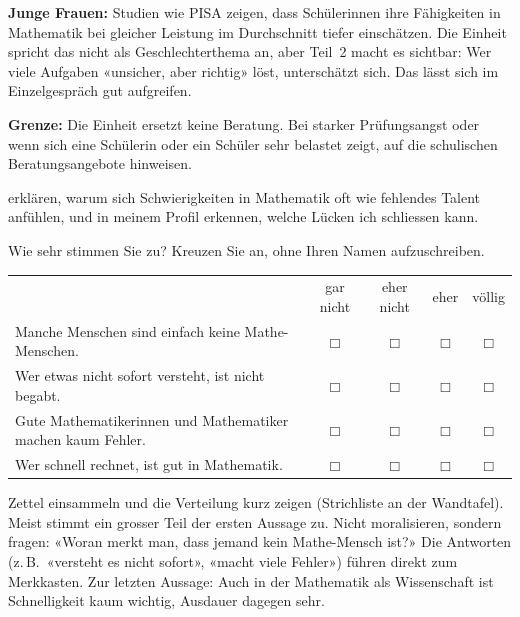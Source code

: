 \documentclass[11pt]{exam}
\begin{document}
\begin{lehrperson}[Überblick]
\textbf{Junge Frauen:} Studien wie PISA zeigen, dass Schülerinnen ihre
Fähigkeiten in Mathematik bei gleicher Leistung im Durchschnitt tiefer
einschätzen. Die Einheit spricht das nicht als Geschlechterthema an, aber
Teil~2 macht es sichtbar: Wer viele Aufgaben «unsicher, aber richtig» löst,
unterschätzt sich. Das lässt sich im Einzelgespräch gut aufgreifen.

\textbf{Grenze:} Die Einheit ersetzt keine Beratung. Bei starker
Prüfungsangst oder wenn sich eine Schülerin oder ein Schüler sehr belastet
zeigt, auf die schulischen Beratungsangebote hinweisen.
\end{lehrperson}

  {erklären, warum sich Schwierigkeiten in Mathematik oft wie fehlendes
   Talent anfühlen, und in meinem Profil erkennen, welche Lücken ich
   schliessen kann.}

\begin{einstieg}
Wie sehr stimmen Sie zu? Kreuzen Sie an, ohne Ihren Namen aufzuschreiben.
\begin{center}
\renewcommand{\arraystretch}{1.5}
\begin{tabular}{p{9.5cm}cccc}
  & \small gar nicht & \small eher nicht & \small eher & \small völlig \\
  Manche Menschen sind einfach keine Mathe-Menschen.
    & $\Box$ & $\Box$ & $\Box$ & $\Box$ \\
  Wer etwas nicht sofort versteht, ist nicht begabt.
    & $\Box$ & $\Box$ & $\Box$ & $\Box$ \\
  Gute Mathematikerinnen und Mathematiker machen kaum Fehler.
    & $\Box$ & $\Box$ & $\Box$ & $\Box$ \\
  Wer schnell rechnet, ist gut in Mathematik.
    & $\Box$ & $\Box$ & $\Box$ & $\Box$
\end{tabular}
\end{center}
\end{einstieg}

\begin{lehrperson}
Zettel einsammeln und die Verteilung kurz zeigen (Strichliste an der
Wandtafel). Meist stimmt ein grosser Teil der ersten Aussage zu. Nicht
moralisieren, sondern fragen: «Woran merkt man, dass jemand kein
Mathe-Mensch ist?» Die Antworten (z.\,B.\ «versteht es nicht sofort», «macht
viele Fehler») führen direkt zum Merkkasten. Zur letzten Aussage: Auch
in der Mathematik als Wissenschaft ist Schnelligkeit kaum wichtig, Ausdauer
dagegen sehr.
\end{lehrperson}
\end{document}
